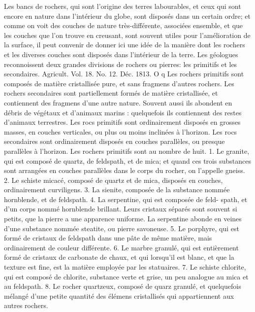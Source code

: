 Les bancs de rochers, qui sont l'origine des terres labourables, et ceux qui sont encore en nature dans l'intérieur du globe, sont disposés dans un certain ordre; et comme on voit des couches de nature très-différente, associées ensemble, et que les couches que l'on trouve en creusant, sont souvent utiles pour l'amélioration de la surface, il peut convenir de donner ici une idée de la manière dont les rochers et les diverses couches sont disposés dans l'intérieur de la terre.
Les géologues reconnoissent deux grandes divisions de rochers ou pierres: les primitifs et les secondaires.
Agricult. Vol. 18. No. 12. Déc. 1813. O q\setcounter{page}{472} Les rochers primitifs sont composés de matière cristallisée pure, et sans fragmens d'autres rochers.
Les rochers secondaires sont partiellement formés de matière cristallisée, et contiennent des fragmens d'une autre nature. Souvent aussi ils abondent en débris de végétaux et d'animaux marins : quelquefois ils contiennent des restes d'animaux terrestres.
Les rocs primitifs sont ordinairement disposés en grosses masses, en couches verticales, ou plus ou moins inclinées à l'horizon.
Les rocs secondaires sont ordinairement disposés en couches parallèles, ou presque parallèles à l'horizon.
Les rochers primitifs sont au nombre de huit.
1. Le granite, qui est composé de quartz, de feldspath, et de mica; et quand ces trois substances sont arrangées en couches parallèles dans le corps du rocher, on l'appelle gneiss.
2. Le schiste micacé, composé de quartz et de mica, disposés en couches, ordinairement curviligens.
3. La sienite, composée de la substance nommée hornblende, et de feldspath.
4. La serpentine, qui est composée de feld-\setcounter{page}{473} spath, et d'un corps nommé hornblende brillant. Leurs cristaux séparés sont souvent si petits, que la pierre a une apparence uniforme. La serpentine abonde en veines d'une substance nommée steatite, ou pierre savoneuse.
5. Le porphyre, qui est formé de cristaux de feldspath dans une pâte de même matière, mais ordinairement de couleur différente.
6. Le marbre granulé, qui est entièrement formé de cristaux de carbonate de chaux, et qui lorsqu'il est blanc, et que la texture est fine, est la matière employée par les statuaires.
7. Le schiste chlorite, qui est composé de chlorite, substance verte et grise, un peu analogue au mica et au feldspath.
8. Le rocher quartzeux, composé de quarz granulé, et quelquefois mélangé d'une petite quantité des élémens cristallisés qui appartiennent aux autres rochers.
